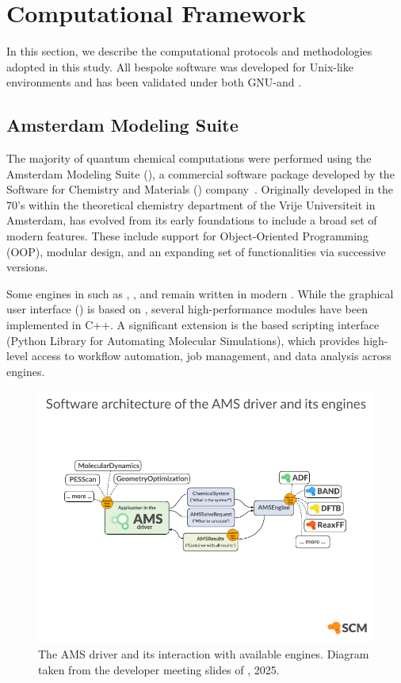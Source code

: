 \newpage
\section{Computational Framework}

In this section, we describe the computational protocols and methodologies
adopted in this study.  All bespoke software was developed for Unix-like
environments and has been validated under both \textsc{GNU}-\Linux and \macOS.

\subsection{Amsterdam Modeling Suite}\label{ams_section}

The majority of quantum chemical computations were performed using the
Amsterdam Modeling Suite (\ams), a commercial software package developed by the
Software for Chemistry and Materials (\scm) company~\cite{ams2025}. Originally
developed in the 70's within the theoretical chemistry department of the Vrije
Universiteit in Amsterdam, \ams has evolved from its early \fortran foundations
to include a broad set of modern features. These include support for
Object-Oriented Programming (OOP), modular design, and an expanding set of
functionalities via successive versions.

Some engines in \ams such as \adf, \band, and \dftb remain written in modern
\fortran. While the graphical user interface (\gui) is based on \tcl,
several high-performance modules have been implemented in C++. A
significant extension is the \python based scripting interface \plams (Python
Library for Automating Molecular Simulations), which provides high-level access
to workflow automation, job management, and data analysis across \ams engines.

\begin{figure}[h!]
  \centering
  \includegraphics[width=1\textwidth]{img/ams_driver}
  \caption{The AMS driver and its interaction with available engines. Diagram
           taken from the developer meeting slides of \scm, 2025.}
  \label{ams_engines}
\end{figure}

